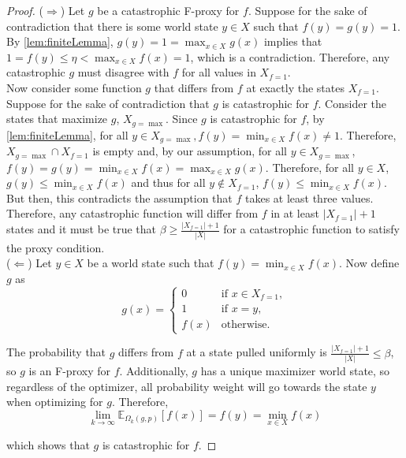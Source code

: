 \documentclass{article}
\begin{document}
\badProxyExistsFiniteB* \label{sec:badProxyExistsFiniteBProof}
\begin{proof} ($\Longrightarrow$)
Let $g$ be a catastrophic F-proxy for $f$. Suppose for the sake of contradiction that there is some world state $y \in X$ such that $f(y) = g(y) = 1$. By \cref{lem:finiteLemma}, $g(y) = 1 = \max_{x \in X} g(x)$ implies that $1 = f(y) \leq \eta < \max_{x \in X} f(x) = 1$, which is a contradiction. Therefore, any catastrophic $g$ must disagree with $f$ for all values in $X_{f=1}$.\\ 

Now consider some function $g$ that differs from $f$ at exactly the states $X_{f=1}$. Suppose for the sake of contradiction that $g$ is catastrophic for $f$. Consider the states that maximize $g$, $X_{g = \max}$. Since $g$ is catastrophic for $f$, by \cref{lem:finiteLemma}, for all $y \in X_{g=\max}, f(y) = \min_{x \in X} f(x) \neq 1$. Therefore, $X_{g=\max} \cap X_{f=1}$ is empty and, by our assumption, for all $y \in X_{g=\max}$, $f(y) = g(y) = \min_{x \in X} f(x) = \max_{x \in X} g(x)$. Therefore, for all $y \in X$, $g(y) \leq \min_{x \in X} f(x)$ and thus for all $y \not\in X_{f=1}$, $f(y) \leq \min_{x \in X} f(x)$. But then, this contradicts the assumption that $f$ takes at least three values.\\

Therefore, any catastrophic function will differ from $f$ in at least $|X_{f=1}| + 1$ states and it must be true that $\beta \geq \frac{|X_{f=1}|+1}{|X|}$ for a catastrophic function to satisfy the proxy condition.\\

($\Longleftarrow$)
Let $y \in X$ be a world state such that $f(y) = \min_{x \in X} f(x)$. Now define $g$ as
$$g(x) = \begin{cases}
    0 & \text{if } x \in X_{f=1},\\
    1 & \text{if } x = y,\\
    f(x) & \text{otherwise}.
\end{cases}$$

The probability that $g$ differs from $f$ at a state pulled uniformly is $\frac{|X_{f=1}| + 1}{|X|} \leq \beta$, so $g$ is an F-proxy for $f$. Additionally, $g$ has a unique maximizer world state, so regardless of the optimizer, all probability weight will go towards the state $y$ when optimizing for $g$. Therefore,
$$\lim_{k \rightarrow \infty} \mathbb E_{\Omega_k(g, p)}[f(x)] = f(y) = \min_{x \in X} f(x)$$

which shows that $g$ is catastrophic for $f$.
\end{proof}
\end{document}
